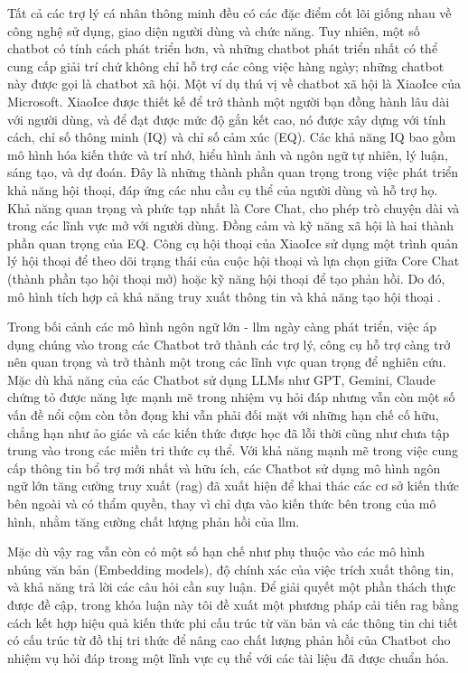 Tất cả các trợ lý cá nhân thông minh đều có các đặc điểm cốt lõi giống nhau về công nghệ sử dụng, giao diện người dùng và chức năng. Tuy nhiên, một số chatbot có tính cách phát triển hơn, và những chatbot phát triển nhất có thể cung cấp giải trí chứ không chỉ hỗ trợ các công việc hàng ngày; những chatbot này được gọi là chatbot xã hội. Một ví dụ thú vị về chatbot xã hội là XiaoIce của Microsoft. XiaoIce được thiết kế để trở thành một người bạn đồng hành lâu dài với người dùng, và để đạt được mức độ gắn kết cao, nó được xây dựng với tính cách, chỉ số thông minh (IQ) và chỉ số cảm xúc (EQ). Các khả năng IQ bao gồm mô hình hóa kiến thức và trí nhớ, hiểu hình ảnh và ngôn ngữ tự nhiên, lý luận, sáng tạo, và dự đoán. Đây là những thành phần quan trọng trong việc phát triển khả năng hội thoại, đáp ứng các nhu cầu cụ thể của người dùng và hỗ trợ họ. Khả năng quan trọng và phức tạp nhất là Core Chat, cho phép trò chuyện dài và trong các lĩnh vực mở với người dùng. Đồng cảm và kỹ năng xã hội là hai thành phần quan trọng của EQ. Công cụ hội thoại của XiaoIce sử dụng một trình quản lý hội thoại để theo dõi trạng thái của cuộc hội thoại và lựa chọn giữa Core Chat (thành phần tạo hội thoại mở) hoặc kỹ năng hội thoại để tạo phản hồi. Do đó, mô hình tích hợp cả khả năng truy xuất thông tin và khả năng tạo hội thoại \cite{dormehl2018xiaoi, spencer2018xiaoi, zhou2019xiaoi}.


Trong bối cảnh các mô hình ngôn ngữ lớn - \gls{llm} ngày càng phát triển, việc áp dụng chúng vào trong các Chatbot trở thành các trợ lý, công cụ hỗ trợ càng trở nên quan trọng và trở thành một trong các lĩnh vực quan trọng để nghiên cứu. Mặc dù khả năng của các Chatbot sử dụng LLMs như GPT, Gemini, Claude chứng tỏ được năng lực mạnh mẽ trong nhiệm vụ hỏi đáp nhưng vẫn còn một số vấn đề nổi cộm còn tồn đọng khi vẫn phải đối mặt với những hạn chế cố hữu, chẳng hạn như ảo giác và các kiến thức được học đã lỗi thời cũng như chưa tập trung vào trong các miền tri thức cụ thể. Với khả năng mạnh mẽ  trong việc cung cấp thông tin bổ trợ mới nhất và hữu ích, các Chatbot sử dụng mô hình ngôn ngữ lớn tăng cường truy xuất (\gls{rag}) đã xuất hiện để khai thác các cơ sở kiến thức bên ngoài và có thẩm quyền, thay vì chỉ dựa vào kiến thức bên trong của mô hình, nhằm tăng cường chất lượng phản hồi của \gls{llm}.


Mặc dù vậy \gls{rag} vẫn còn có một số hạn chế như phụ thuộc vào các mô hình nhúng văn bản (Embedding models), độ chính xác của việc trích xuất thông tin, và khả năng trả lời các câu hỏi cần suy luận. Để giải quyết một phần thách thực được đề cập, trong khóa luận này tôi đề xuất một phương pháp cải tiến \gls{rag} bằng cách kết hợp hiệu quả kiến thức phi cấu trúc từ văn bản và các thông tin chi tiết có cấu trúc từ đồ thị tri thức để nâng cao chất lượng phản hồi của Chatbot cho nhiệm vụ hỏi đáp trong một lĩnh vực cụ thể với các tài liệu đã được chuẩn hóa.


